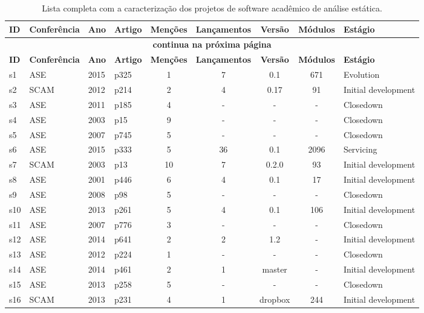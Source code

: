 \begin{longtable}{| l | l | l | l | c | c | c | c | l |}
  \caption{Lista completa com a caracterização dos projetos de software acadêmico de análise estática.}
  \label{dataset-table} \\
  \hline
  \endfirsthead
  \hline
  \textbf{ID} & \textbf{Conferência} & \textbf{Ano} & \textbf{Artigo} & \textbf{Menções} & \textbf{Lançamentos} & \textbf{Versão} & \textbf{Módulos} & \textbf{Estágio} \\
  \hline
  \endhead
  \multicolumn{9}{c}{\textbf{continua na próxima página}} \\
  \hhline{---------} \endfoot
  \endlastfoot
  \textbf{ID} & \textbf{Conferência} & \textbf{Ano} & \textbf{Artigo} & \textbf{Menções} & \textbf{Lançamentos} & \textbf{Versão} & \textbf{Módulos} & \textbf{Estágio} \\
  \hline
s1 & ASE & 2015 & p325 & 1 & 7 & 0.1 & 671 & Evolution \\
    \hline
s2 & SCAM & 2012 & p214 & 2 & 4 & 0.17 & 91 & Initial development \\
    \hline
s3 & ASE & 2011 & p185 & 4 & - & - & - & Closedown \\
    \hline
s4 & ASE & 2003 & p15 & 9 & - & - & - & Closedown \\
    \hline
s5 & ASE & 2007 & p745 & 5 & - & - & - & Closedown \\
    \hline
s6 & ASE & 2015 & p333 & 5 & 36 & 0.1 & 2096 & Servicing \\
    \hline
s7 & SCAM & 2003 & p13 & 10 & 7 & 0.2.0 & 93 & Initial development \\
    \hline
s8 & ASE & 2001 & p446 & 6 & 4 & 0.1 & 17 & Initial development \\
    \hline
s9 & ASE & 2008 & p98 & 5 & - & - & - & Closedown \\
    \hline
s10 & ASE & 2013 & p261 & 5 & 4 & 0.1 & 106 & Initial development \\
    \hline
s11 & ASE & 2007 & p776 & 3 & - & - & - & Closedown \\
    \hline
s12 & ASE & 2014 & p641 & 2 & 2 & 1.2 & - & Initial development \\
    \hline
s13 & ASE & 2012 & p224 & 1 & - & - & - & Closedown \\
    \hline
s14 & ASE & 2014 & p461 & 2 & 1 & master & - & Initial development \\
    \hline
s15 & ASE & 2013 & p258 & 5 & - & - & - & Closedown \\
    \hline
s16 & SCAM & 2013 & p231 & 4 & 1 & dropbox & 244 & Initial development \\

\end{longtable}
